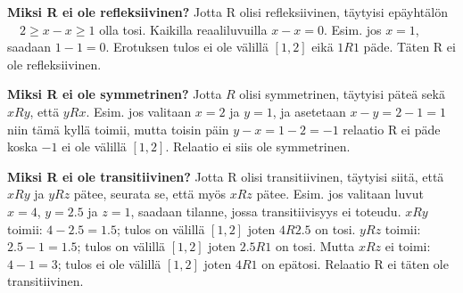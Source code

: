 \documentclass[a4paper,12pt]{article}
\begin{document}
\begin{enumerate}
\begin{enumerate}
    \textbf{Miksi R ei ole refleksiivinen?} Jotta R olisi refleksiivinen, täytyisi epäyhtälön $\quad 2 \ge x-x \ge 1$ olla tosi. Kaikilla  reaaliluvuilla $x-x=0$. Esim. jos $x=1$, saadaan $1-1=0$. Erotuksen tulos ei ole välillä $[1,2]$ eikä $1R1$ päde. Täten R ei ole refleksiivinen.

    \textbf{Miksi R ei ole symmetrinen?} Jotta $R$ olisi symmetrinen, täytyisi päteä sekä $xRy$, että $yRx$. Esim. jos valitaan $x=2$ ja $y=1$, ja asetetaan $x-y=2-1=1$ niin tämä kyllä toimii, mutta toisin päin $y-x=1-2=-1$ relaatio R ei päde koska $-1$ ei ole välillä $[1,2]$. Relaatio ei siis ole symmetrinen.

    \textbf{Miksi R ei ole transitiivinen?} Jotta R olisi transitiivinen, täytyisi siitä, että $xRy$ ja $yRz$ pätee, seurata se, että myös $xRz$ pätee. Esim. jos valitaan luvut $x=4$, $y=2.5$ ja $z=1$, saadaan tilanne, jossa transitiivisyys ei toteudu. $xRy$ toimii: $4-2.5=1.5$; tulos on välillä $[1,2]$ joten $4R2.5$ on tosi. $yRz$ toimii: $2.5-1=1.5$; tulos on välillä $[1,2]$ joten $2.5R1$ on tosi. Mutta $xRz$ ei toimi: $4-1=3$; tulos ei ole välillä $[1,2]$ joten $4R1$ on epätosi. Relaatio R ei täten ole transitiivinen. 

\end{enumerate}

\end{enumerate}
\end{document}
